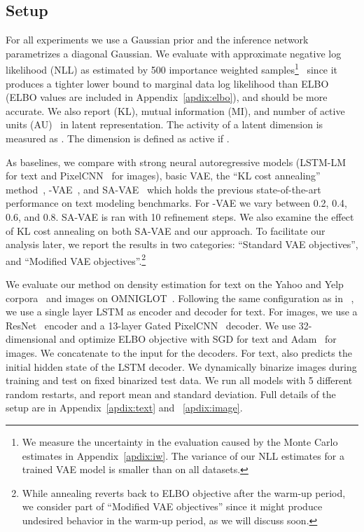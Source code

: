 \documentclass{article} \usepackage{iclr2019_conference,times}
\begin{document}
\subsection{Setup}
For all experiments we use a Gaussian prior  and the inference network parametrizes a diagonal Gaussian. We evaluate with approximate negative log likelihood (NLL) as estimated by 500 importance weighted samples\footnote{We measure the uncertainty in the evaluation caused by the Monte Carlo estimates in Appendix~\ref{apdix:iw}. The variance of our NLL estimates for a trained VAE model is smaller than  on all datasets. }~\citep{burda2015importance} since it produces a tighter lower bound to marginal data log likelihood than ELBO (ELBO values are included in Appendix~\ref{apdix:elbo}), and should be more accurate. We also report  (KL), mutual information  (MI),  and number of active units (AU)~\citep{burda2015importance} in latent representation. The activity of a latent dimension  is measured as . The dimension  is defined as active if .

As baselines, we compare with strong neural autoregressive models (LSTM-LM for text and PixelCNN~\citep{van2016conditional} for images), basic VAE, the ``KL cost annealing'' method~\citep{bowman2015generating,sonderby2016ladder}, -VAE~\citep{higgins2016beta}, and SA-VAE~\citep{kim2018semi} which holds the previous state-of-the-art performance on text modeling benchmarks. For -VAE we vary  between 0.2, 0.4, 0.6, and 0.8. SA-VAE is ran with 10 refinement steps. We also examine the effect of KL cost annealing on both SA-VAE and our approach. To facilitate our analysis later, we report the results in two categories: ``Standard VAE objectives'', and ``Modified VAE objectives''.\footnote{While annealing reverts back to ELBO objective after the warm-up period, we consider part of ``Modified VAE objectives'' since it might produce undesired behavior in the warm-up period, as we will discuss soon.}

We evaluate our method on density estimation for text on the Yahoo and Yelp corpora~\citep{yang2017improved} and images on OMNIGLOT~\citep{lake2015human}. Following the same configuration as in ~\citet{kim2018semi}, we use a single layer LSTM as encoder and decoder for text. For images, we use a ResNet~\citep{he2016deep} encoder and a 13-layer Gated PixelCNN~\citep{van2016conditional} decoder. We use 32-dimensional  and optimize ELBO objective with SGD for text and Adam~\citep{kingma2014adam} for images. We concatenate  to the input for the decoders. For text,  also predicts the initial hidden state of the LSTM decoder. We dynamically binarize images during training and test on fixed binarized test data. We run all models with 5 different random restarts, and report mean and standard deviation. Full details of the setup are in Appendix~\ref{apdix:text} and ~\ref{apdix:image}.
\end{document}
